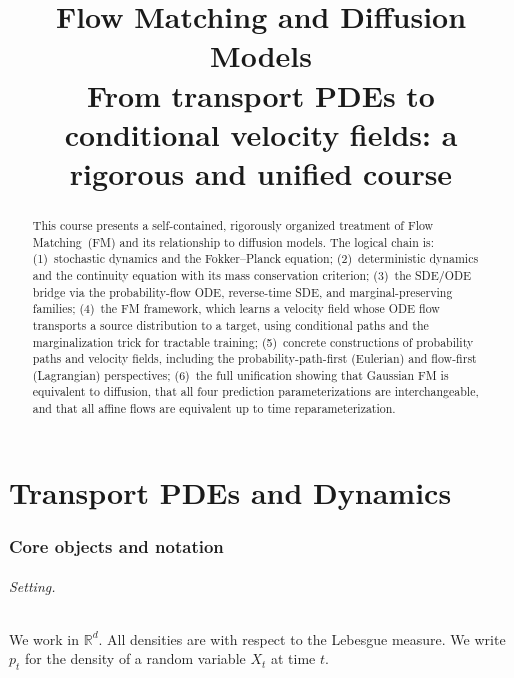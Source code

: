 \documentclass[11pt]{article}
\title{\textbf{Flow Matching and Diffusion Models}\\[6pt]
\large From transport PDEs to conditional velocity fields: a rigorous and unified course}
\author{}
\date{}
\newcommand{\R}{\mathbb{R}}
\theoremstyle{definition}
\theoremstyle{remark}
\begin{document}
\maketitle

\begin{abstract}
This course presents a self-contained, rigorously organized treatment of Flow Matching~(FM) and its relationship to diffusion models.
The logical chain is: (1)~stochastic dynamics and the Fokker--Planck equation; (2)~deterministic dynamics and the continuity equation with its mass conservation criterion; (3)~the SDE/ODE bridge via the probability-flow ODE, reverse-time SDE, and marginal-preserving families; (4)~the FM framework, which learns a velocity field whose ODE flow transports a source distribution to a target, using conditional paths and the marginalization trick for tractable training; (5)~concrete constructions of probability paths and velocity fields, including the probability-path-first (Eulerian) and flow-first (Lagrangian) perspectives; (6)~the full unification showing that Gaussian FM is equivalent to diffusion, that all four prediction parameterizations are interchangeable, and that all affine flows are equivalent up to time reparameterization.
\end{abstract}

\tableofcontents
\newpage


\part{Transport PDEs and Dynamics}

\section{Core objects and notation}\label{sec:notation}

\paragraph{Setting.}
We work in $\R^d$.
All densities are with respect to the Lebesgue measure.
We write $p_t$ for the density of a random variable $X_t$ at time $t$.
\end{document}
